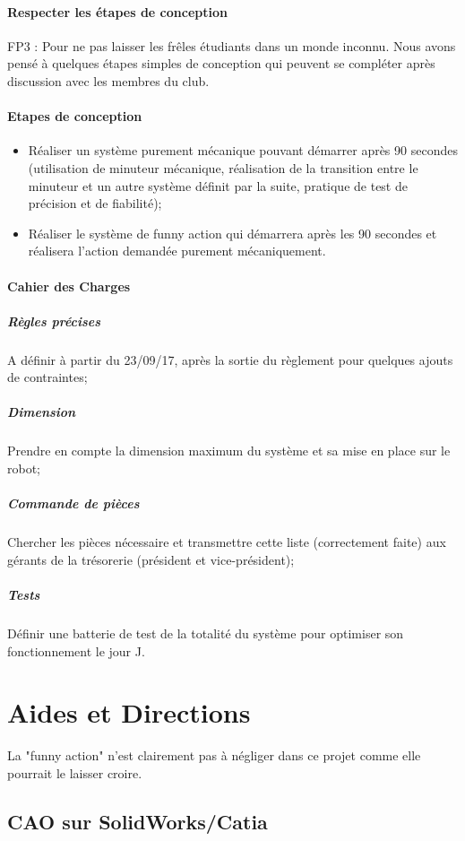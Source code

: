 \documentclass[fleqn,10pt]{SelfArx} %
\begin{document}
\paragraph{Respecter les étapes de conception}
FP3 : Pour ne pas laisser les frêles étudiants dans un monde inconnu. Nous avons pensé à quelques étapes simples de conception qui peuvent se compléter après discussion avec les membres du club.

\paragraph{Etapes de conception}
\begin{itemize}
\item Réaliser un système purement mécanique pouvant démarrer après 90 secondes (utilisation de minuteur mécanique, réalisation de la transition entre le minuteur et un autre système définit par la suite, pratique de test de précision et de fiabilité);
\item Réaliser le système de funny action qui démarrera après les 90 secondes et réalisera l'action demandée purement mécaniquement.
\end{itemize}

\paragraph{Cahier des Charges}
\subparagraph{Règles précises}
A définir à partir du 23/09/17, après la sortie du règlement pour quelques ajouts de contraintes;
\subparagraph{Dimension}
Prendre en compte la dimension maximum du système et sa mise en place sur le robot;
\subparagraph{Commande de pièces}
Chercher les pièces nécessaire et transmettre cette liste (correctement faite) aux gérants de la trésorerie (président et vice-président);
\subparagraph{Tests}
Définir une batterie de test de la totalité du système pour optimiser son fonctionnement le jour J.




\section{Aides et Directions}

La "funny action" n'est clairement pas à négliger dans ce projet comme elle pourrait le laisser croire.
	
\subsection{CAO sur SolidWorks/Catia}
\end{document}
